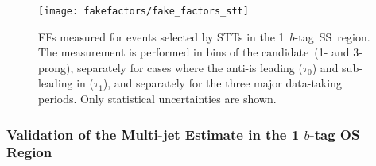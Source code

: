 

\begin{figure}[htbp]
  \centering

  \texttt{[image: fakefactors/fake\_factors\_stt]}

  \caption[FFs for events selected by STTs.]{FFs measured for events selected by
    STTs in the 1~$b$-tag~SS~region. The measurement is performed in bins of the
    \tauhadvis candidate~\Ntracks (1- and 3-prong), separately for cases where
    the anti-\tauhadvis is leading ($\tau_0$) and sub-leading in \pT ($\tau_1$),
    and separately for the three major data-taking periods. Only statistical
    uncertainties are shown.}%
  \label{fig:mjfakes_stt_ffs}
\end{figure}

\subsubsection{Validation of the Multi-jet Estimate in the 1 $b$-tag OS Region}

